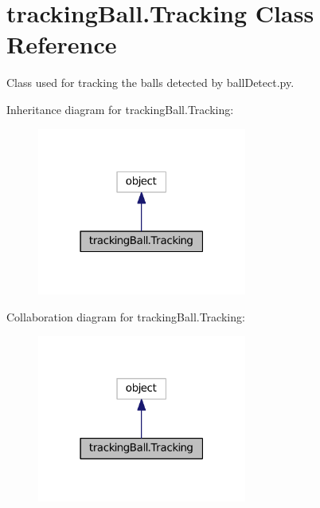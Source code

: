 \hypertarget{classtrackingBall_1_1Tracking}{}\section{tracking\+Ball.\+Tracking Class Reference}
\label{classtrackingBall_1_1Tracking}


Class used for tracking the balls detected by ball\+Detect.\+py.  




Inheritance diagram for tracking\+Ball.\+Tracking\+:
\nopagebreak
\begin{figure}[H]
\begin{center}
\leavevmode
\includegraphics[width=195pt]{classtrackingBall_1_1Tracking__inherit__graph}
\end{center}
\end{figure}


Collaboration diagram for tracking\+Ball.\+Tracking\+:
\nopagebreak
\begin{figure}[H]
\begin{center}
\leavevmode
\includegraphics[width=195pt]{classtrackingBall_1_1Tracking__coll__graph}
\end{center}
\end{figure}
